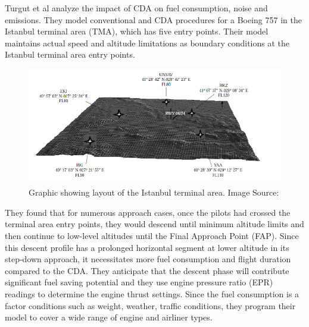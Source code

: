 \documentclass{aer1315-pretty}
\begin{document}

Turgut et al \cite{Enis:2010} analyze the impact of CDA on fuel consumption, noise and emissions. They model conventional and CDA procedures for a Boeing 757 in the Istanbul terminal area (TMA), which has five entry points. Their model maintains actual speed and altitude limitations as boundary conditions at the Istanbul terminal area entry points. 

\begin{figure}
\centering
\includegraphics[height=0.45\textwidth]{figures/IST_terminal_area.png}
	\caption{Graphic showing layout of the Istanbul terminal area. Image Source: \cite{Enis:2010}}	
	\label{fig:IST}
\end{figure}

They found that for numerous approach cases, once the pilots had crossed the terminal area entry points, they would descend until minimum altitude limits and then continue to low-level altitudes until the Final Approach Point (FAP). Since this descent profile has a prolonged horizontal segment at lower altitude in its step-down approach, it necessitates more fuel consumption and flight duration compared to the CDA. They anticipate that the descent phase will contribute significant fuel saving potential and they use engine pressure ratio (EPR) readings to determine the engine thrust settings. Since the fuel consumption is a factor conditions such as weight, weather, traffic conditions, they program their model to cover a wide range of engine and airliner types. \par
\end{document}
